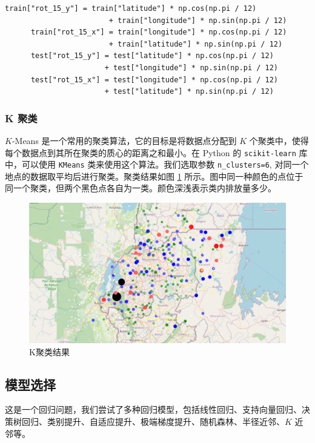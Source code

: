 \documentclass{ctexart}
\begin{document}
\begin{lstlisting}[style=Python]
      train["rot_15_y"] = train["latitude"] * np.cos(np.pi / 12) 
                        + train["longitude"] * np.sin(np.pi / 12)
      train["rot_15_x"] = train["longitude"] * np.cos(np.pi / 12) 
                        + train["latitude"] * np.sin(np.pi / 12)
      test["rot_15_y"] = test["latitude"] * np.cos(np.pi / 12) 
                       + test["longitude"] * np.sin(np.pi / 12)
      test["rot_15_x"] = test["longitude"] * np.cos(np.pi / 12) 
                       + test["latitude"] * np.sin(np.pi / 12)
\end{lstlisting}

\subsubsection{K 聚类}

$K$-Means 是一个常用的聚类算法，它的目标是将数据点分配到 $K$ 个聚类中，使得每个数据点到其所在聚类的质心的距离之和最小。在 Python 的 \texttt{scikit-learn} 库中，可以使用 \texttt{KMeans} 类来使用这个算法。我们选取参数 \texttt{n\_clusters=6}, 对同一个地点的数据取平均后进行聚类。聚类结果如图 \ref{fig:10} 所示。图中同一种颜色的点位于同一个聚类，但两个黑色点各自为一类。颜色深浅表示类内排放量多少。

\begin{figure}[H]
      \centering
      \includegraphics[width=1\textwidth]{output10.png}
      \caption{K聚类结果}
      \label{fig:10}
\end{figure}

\subsection{模型选择}

这是一个回归问题，我们尝试了多种回归模型，包括线性回归、支持向量回归、决策树回归、类别提升、自适应提升、极端梯度提升、随机森林、半径近邻、$K$ 近邻等。
\end{document}
